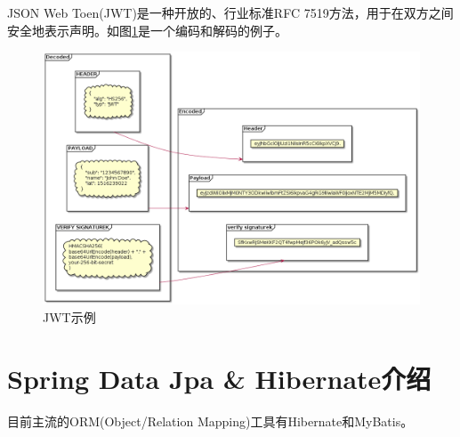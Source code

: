 JSON Web Toen(JWT)是一种开放的、行业标准RFC 7519方法，用于在双方之间安全地表示声明。如图\ref{jwt}是一个编码和解码的例子。
\begin{figure}[h]
    \centering
    \includegraphics[scale = 0.4]{out/uml/部署图/JWT/JWT.png}
    \caption{\song\wuhao JWT示例}
    \label{jwt}
\end{figure}

\section{Spring Data Jpa \& Hibernate介绍}

目前主流的ORM(Object/Relation Mapping)工具有Hibernate和MyBatis。

